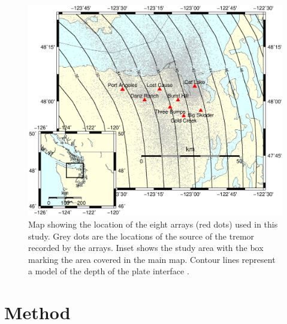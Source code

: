 \documentclass[draft]{agujournal2019}
\begin{document}
\begin{figure}
\noindent\includegraphics[width=\textwidth, trim={0cm 2.5cm 0cm 9.5cm},clip]{figures/arrays_location.eps}
\caption{Map showing the location of the eight arrays (red dots) used in this study. Grey dots are the locations of the source of the tremor recorded by the arrays. Inset shows the study area with the box marking the area covered in the main map. Contour lines represent a model of the depth of the plate interface \cite{MCC_2006}.}
\label{pngfiguresample}
\end{figure}

\section{Method}
\end{document}
